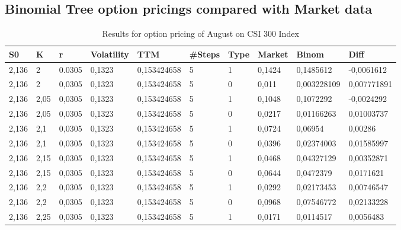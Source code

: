 \documentclass[11pt, titlepage]{article}
\begin{document}
\subsection{Binomial Tree option pricings compared with Market data}{
\begin{table}[ht]
\centering
\caption{Results for option pricing of August on CSI 300 Index}
\label{Option results August}
\begin{tabular}{@{}llllllllll@{}}
\toprule
\textbf{S0} & \textbf{K} & \textbf{r} & \textbf{Volatility} & \textbf{TTM} & \textbf{\#Steps} & \textbf{Type} & \textbf{Market} & \textbf{Binom} & \textbf{Diff} \\ \midrule
2,136 & 2 & 0.0305 & 0,1323 & 0,153424658 & 5 & 1 & 0,1424 & {\color[HTML]{3531FF} 0,1485612} & {\color[HTML]{F8A102} -0,0061612} \\
2,136 & 2 & 0,0305 & 0,1323 & 0,153424658 & 5 & 0 & 0,011 & {\color[HTML]{3531FF} 0,003228109} & {\color[HTML]{F8A102} 0,007771891} \\
2,136 & 2,05 & 0,0305 & 0,1323 & 0,153424658 & 5 & 1 & 0,1048 & {\color[HTML]{3531FF} 0,1072292} & {\color[HTML]{F8A102} -0,0024292} \\
2,136 & 2,05 & 0,0305 & 0,1323 & 0,153424658 & 5 & 0 & 0,0217 & {\color[HTML]{3531FF} 0,01166263} & {\color[HTML]{F8A102} 0,01003737} \\
2,136 & 2,1 & 0,0305 & 0,1323 & 0,153424658 & 5 & 1 & 0,0724 & {\color[HTML]{3531FF} 0,06954} & {\color[HTML]{F8A102} 0,00286} \\
2,136 & 2,1 & 0,0305 & 0,1323 & 0,153424658 & 5 & 0 & 0,0396 & {\color[HTML]{3531FF} 0,02374003} & {\color[HTML]{F8A102} 0,01585997} \\
2,136 & 2,15 & 0,0305 & 0,1323 & 0,153424658 & 5 & 1 & 0,0468 & {\color[HTML]{3531FF} 0,04327129} & {\color[HTML]{F8A102} 0,00352871} \\
2,136 & 2,15 & 0,0305 & 0,1323 & 0,153424658 & 5 & 0 & 0,0644 & {\color[HTML]{3531FF} 0,0472379} & {\color[HTML]{F8A102} 0,0171621} \\
2,136 & 2,2 & 0,0305 & 0,1323 & 0,153424658 & 5 & 1 & 0,0292 & {\color[HTML]{3531FF} 0,02173453} & {\color[HTML]{F8A102} 0,00746547} \\
2,136 & 2,2 & 0,0305 & 0,1323 & 0,153424658 & 5 & 0 & 0,0968 & {\color[HTML]{3531FF} 0,07546772} & {\color[HTML]{F8A102} 0,02133228} \\
2,136 & 2,25 & 0,0305 & 0,1323 & 0,153424658 & 5 & 1 & 0,0171 & {\color[HTML]{3531FF} 0,0114517} & {\color[HTML]{F8A102} 0,0056483} \\

\end{tabular}
\end{table}}
\end{document}
